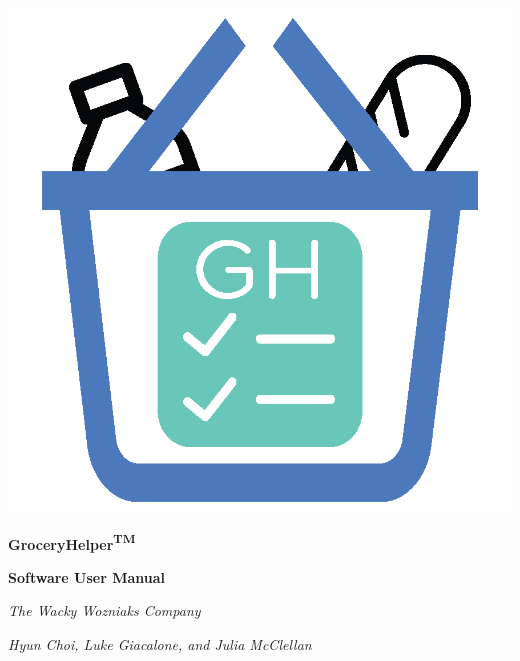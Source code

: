 \documentclass[letterpaper,12pt]{article}
\begin{document}
\thispagestyle{empty}

\begin{titlepage}



\vspace*{\fill}

\begin{center}

\includegraphics[scale=0.7]{LOGO.png}


\begin{LARGE}

\textbf{GroceryHelper\Large{\textsuperscript{TM}}}

\textbf{Software User Manual}


\vspace{0.1in}



\end{LARGE}


\vspace{0.5in}



\begin{Large}
\textit{The Wacky Wozniaks Company}
\end{Large}

\begin{large}
\textit{Hyun Choi, Luke Giacalone, and Julia McClellan}
\end{large}



\end{center}



\vspace*{\fill}

\end{titlepage}
\end{document}

